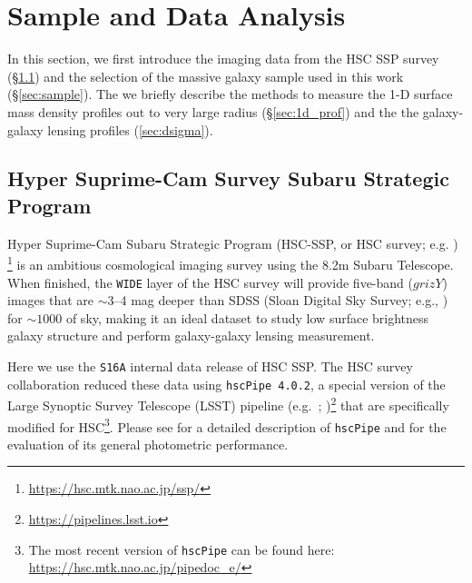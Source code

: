 \documentclass[fleqn,usenatbib,useAMS,english]{mnras}
\begin{document}
\section{Sample and Data Analysis}
    \label{sec:data}

    In this section, we first introduce the imaging data from the HSC SSP survey
    (\S \ref{sec:hsc}) and the selection of the massive galaxy sample used in this work
    (\S \ref{sec:sample}).
    The we briefly describe the methods to measure the 1-D surface mass density profiles
    out to very large radius (\S \ref{sec:1d_prof}) and the the galaxy-galaxy lensing \dsigma{}
    profiles (\ref{sec:dsigma}).


\subsection{Hyper Suprime-Cam Survey Subaru Strategic Program}
    \label{sec:hsc}

    Hyper Suprime-Cam Subaru Strategic Program (HSC-SSP, or HSC survey; e.g.
    \citealt{HSC-SSP, HSC-DR1, HSC-DR2})
    \footnote{\url{https://hsc.mtk.nao.ac.jp/ssp/}} is an ambitious cosmological imaging survey
    using the 8.2m Subaru Telescope.
    When finished, the \texttt{WIDE} layer of the HSC survey will provide five-band ($grizY$)
    images that are $\sim$3--4 mag deeper than SDSS (Sloan Digital Sky Survey;
    e.g., \citealt{SDSS-DR7, SDSS-DR8, SDSS-DR12}) for $\sim 1000$ \sqdeg{} of sky, making
    it an ideal dataset to study low surface brightness galaxy structure and perform
    galaxy-galaxy lensing measurement.

    Here we use the \texttt{S16A} internal data release of HSC SSP.
    The HSC survey collaboration reduced these data using \texttt{hscPipe 4.0.2}, a special
    version of the Large Synoptic Survey Telescope (LSST) pipeline (e.g.\ \citealt{Juric2015};
    \citealt{Axelrod2010})\footnote{\url{https://pipelines.lsst.io}} that are specifically
    modified for HSC\footnote{The most recent version of \texttt{hscPipe} can be found here:
    \url{https://hsc.mtk.nao.ac.jp/pipedoc_e/}}.
    Please see \citet{HSC-PIPE} for a detailed description of \texttt{hscPipe} and
    \citet{SynPipe} for the evaluation of its general photometric performance.
\end{document}
